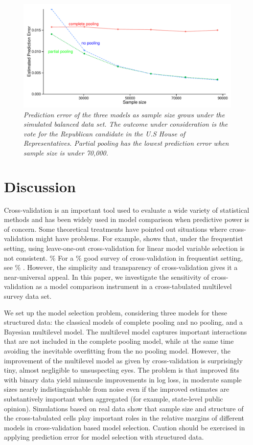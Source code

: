 \documentclass[11pt,article,oneside]{memoir}
\begin{document}
\begin{figure}[h]
  \centering
  \includegraphics[width=.45\textwidth]{hourvote_bal.pdf}
  \caption{\em Prediction error of the three models as sample size grows under the
    simulated balanced data set. The outcome under consideration is the vote for
    the Republican candidate in the U.S House of Representatives. Partial
    pooling has the lowest prediction error when sample size is under 70,000.}
  \label{fig:hourvote_bal}
\end{figure}

\section{Discussion}\label{discussion}

Cross-validation is an important tool used to evaluate a wide variety of
statistical methods and has been widely used in model comparison when
predictive power is of concern. Some theoretical treatments have pointed
out situations where cross-validation might have problems. For example,
\citet{shao1993linear} shows that, under the frequentist setting, using
leave-one-out cross-validation for linear model variable selection is
not consistent. \% For a \% good survey of cross-validation in
frequentist setting, see \% \citet{arlot2010survey}. However, the
simplicity and transparency of cross-validation gives it a
near-universal appeal. In this paper, we investigate the sensitivity of
cross-validation as a model comparison instrument in a cross-tabulated
multilevel survey data set.

We set up the model selection problem, considering three models for
these structured data: the classical models of complete pooling and no
pooling, and a Bayesian multilevel model. The multilevel model captures
important interactions that are not included in the complete pooling
model, while at the same time avoiding the inevitable overfitting from
the no pooling model. However, the improvement of the multilevel model
as given by cross-validation is surprisingly tiny, almost negligible to
unsuspecting eyes. The problem is that improved fits with binary data
yield minuscule improvements in log loss, in moderate sample sizes
nearly indistinguishable from noise even if the improved estimates are
substantively important when aggregated (for example, state-level public
opinion). Simulations based on real data show that sample size and
structure of the cross-tabulated cells play important roles in the
relative margins of different models in cross-validation based model
selection. Caution should be exercised in applying prediction error for
model selection with structured data.
\end{document}
